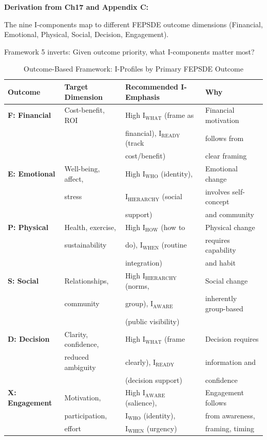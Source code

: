 \textbf{Derivation from Ch17 and Appendix C:}

The nine I-components map to different FEPSDE outcome dimensions (Financial, Emotional, Physical, Social, Decision, Engagement).

Framework 5 inverts: Given outcome priority, what I-components matter most?

\begin{table}[htbp]
\centering
\caption{Outcome-Based Framework: I-Profiles by Primary FEPSDE Outcome}
\label{tab:20-f5-outcomes}
\renewcommand{\arraystretch}{1.3}
\footnotesize
\begin{tabular}{@{}llll@{}}
\toprule
\textbf{Outcome} & \textbf{Target Dimension} & \textbf{Recommended I-Emphasis} & \textbf{Why} \\
\midrule
\textbf{F: Financial} & Cost-benefit, ROI & High I$_{\text{WHAT}}$ (frame as & Financial motivation \\
& & financial), I$_{\text{READY}}$ (track & follows from \\
& & cost/benefit) & clear framing \\
\midrule
\textbf{E: Emotional} & Well-being, affect, & High I$_{\text{WHO}}$ (identity), & Emotional change \\
& stress & I$_{\text{HIERARCHY}}$ (social & involves self-concept \\
& & support) & and community \\
\midrule
\textbf{P: Physical} & Health, exercise, & High I$_{\text{HOW}}$ (how to & Physical change \\
& sustainability & do), I$_{\text{WHEN}}$ (routine & requires capability \\
& & integration) & and habit \\
\midrule
\textbf{S: Social} & Relationships, & High I$_{\text{HIERARCHY}}$ (norms, & Social change \\
& community & group), I$_{\text{AWARE}}$ & inherently group-based \\
& & (public visibility) & \\
\midrule
\textbf{D: Decision} & Clarity, confidence, & High I$_{\text{WHAT}}$ (frame & Decision requires \\
& reduced ambiguity & clearly), I$_{\text{READY}}$ & information and \\
& & (decision support) & confidence \\
\midrule
\textbf{X: Engagement} & Motivation, & High I$_{\text{AWARE}}$ (salience), & Engagement follows \\
& participation, & I$_{\text{WHO}}$ (identity), & from awareness, \\
& effort & I$_{\text{WHEN}}$ (urgency) & framing, timing \\
\bottomrule
\end{tabular}
\end{table}

